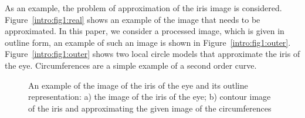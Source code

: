 As an example, the problem of approximation of the iris image is considered. Figure~\ref{intro:fig1:real} shows an example of the image that needs to be approximated. In this paper, we consider a processed image, which is given in outline form, an example of such an image is shown in Figure~\ref{intro:fig1:outer}. Figure~\ref{intro:fig1:outer} shows two local circle models that approximate the iris of the eye. Circumferences are a simple example of a second order curve.

\begin{figure}[h!]
\caption{An example of the image of the iris of the eye and its outline representation: a) the image of the iris of the eye; b) contour image of the iris and approximating the given image of the circumferences}
\label{intro:fig1}
\end{figure}

